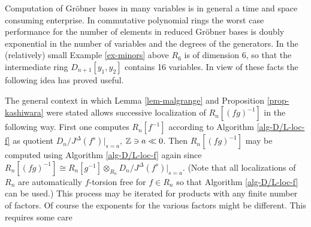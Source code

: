 Computation of Gr\"obner bases in many variables is in general a time
and space consuming enterprise. In commutative polynomial
rings the worst case performance for the number of elements in reduced
Gr\"obner bases 
is doubly exponential in the number of variables and the degrees of
the generators. In the (relatively) small 
Example \ref{ex-minors} above $R_6$ is of dimension 6,
so that the intermediate ring $D_{n+1}[y_1,y_2]$ contains 16
variables. In view of these facts the following idea 
has proved useful. 

The general context in which Lemma \ref{lem-malgrange} and Proposition
\ref{prop-kashiwara} were stated allows successive localization of
$R_n[(fg)^{-1}]$ 
in the following way. First one computes $R_n[f^{-1}]$ according to
Algorithm \ref{alg-D/L-loc-f} as quotient $D_n/J^\Delta(f^s)|_{s=a}$,
${\mathbb Z}\ni a\ll 0$.  
Then $R_n[(fg)^{-1}]$ may be
computed using  Algorithm 
\ref{alg-D/L-loc-f} again since $R_n[(fg)^{-1}]\cong
R_n[g^{-1}]\otimes_{R_n} 
D_n/J^\Delta(f^s)|_{s=a}$. (Note that all
localizations of $R_n$ are automatically $f$-torsion free for $f\in R_n$
so that Algorithm \ref{alg-D/L-loc-f} can be used.) This process
may be iterated for products with any finite number of factors. 
Of course the exponents for the various factors might be different. 
This requires some care 
%
%
